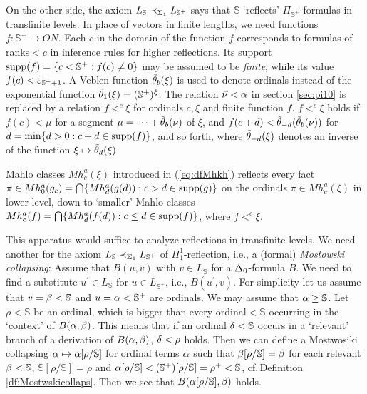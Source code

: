 \documentclass{article}
\newcommand{\mS}{\mathbb{S}}
\begin{document}
On the other side, the axiom $L_{\mS}\prec_{\Sig_{1}}L_{\mS^{+}}$ says that
$\mS$ `reflects' $\Pi_{\mS^{+}}$-formulas in transfinite levels.
In place of vectors in finite lengths, we need functions
$f:\mS^{+}\to ON$.
Each $c$ in the domain of the function $f$ corresponds to
formulas of ranks$<c$ in inference rules for higher reflections.
Its support ${\rm supp}(f)=\{c<\mS^{+}: f(c)\neq 0\}$ may be assumed to be \textit{finite},
while its value $f(c)<\veps_{\mS^{+}+1}$.
A Veblen function $\tilde{\theta}_{b}(\xi)$ is used to denote ordinals
instead of the exponential function $\tilde{\tht}_{1}(\xi)=(\mS^{+})^{\xi}$.
The relation $\vec{\nu}<\alpha$ in section \ref{sec:pi10} is replaced by a relation
$f<^{c}\xi$ for ordinals $c,\xi$ and finite function $f$.
$f<^{c}\xi$ holds if $f(c)<\mu$ for a segment $\mu=\cdots+\tilde{\theta}_{b}(\nu)$ of $\xi$, and
$f(c+d)<\tilde{\theta}_{-d}(\tilde{\theta}_{b}(\nu))$ for $d=\min\{d>0: c+d\in{\rm supp}(f)\}$,
and so forth, where $\tilde{\theta}_{-d}(\xi)$ denotes an inverse of the function
$\xi\mapsto\tilde{\theta}_{d}(\xi)$.


Mahlo classes $Mh_{c}^{a}(\xi)$ introduced in (\ref{eq:dfMhkh})
reflects every fact 
$\pi\in Mh_{0}^{a}(g_{c})=\bigcap\{Mh^{a}_{d}(g(d)): c>d\in {\rm supp}(g)\}$ 
on the ordinals $\pi\in Mh_{c}^{a}(\xi)$ in lower level,
down to
`smaller' Mahlo classes $Mh_{c}^{a}(f)=\bigcap\{Mh^{a}_{d}(f(d)): c\leq d\in {\rm supp}(f)\}$,
where
$f<^{c}\xi$.

This apparatus would suffice to analyze reflections in transfinite levels.
We need another for the axiom $L_{\mS}\prec_{\Sig_{1}}L_{\mS^{+}}$ of $\Pi^{1}_{1}$-reflection, i.e.,
a (formal) \textit{Mostowski collapsing}:
Assume that $B(u,v)$ with $v\in L_{\mS}$ for a $\Delta_{0}$-formula $B$.
We need to find a substitute $u^{\prime}\in L_{\mS}$ for $u\in L_{\mS^{+}}$, i.e.,
$B(u^{\prime},v)$.
For simplicity let us assume that $v=\bet<\mS$ and $u=\alp<\mS^{+}$ are ordinals.
We may assume that $\alp\geq\mS$.
Let $\rho<\mS$ be an ordinal, which is bigger than every ordinal$<\mS$
occurring in the `context' of $B(\alpha,\beta)$.
This means that if an ordinal $\del<\mS$ occurs in a `relevant' branch of a
derivation of $B(\alpha,\beta)$, $\delta<\rho$ holds.
Then we can define a Mostwosiki collapsing $\alp\mapsto\alp[\rho/\mS]$ for
ordinal terms $\alpha$ such that
$\bet[\rho/\mS]=\bet$ for each relevant $\bet<\mS$, $\mS[\rho/\mS]=\rho$ and
$\alp[\rho/\mS]<(\mS^{+})[\rho/\mS]=\rho^{+}<\mS$, cf.\,Definition \ref{df:Mostwskicollaps}.
Then we see that $B(\alp[\rho/\mS],\bet)$ holds.
\end{document}
